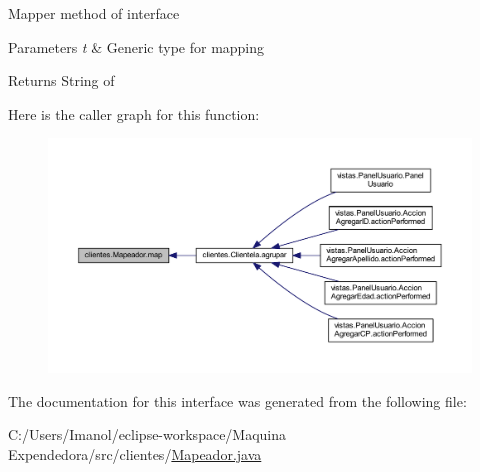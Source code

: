 Mapper method of interface 
\begin{DoxyParams}{Parameters}
{\em t} & Generic type for mapping \\
\hline
\end{DoxyParams}
\begin{DoxyReturn}{Returns}
String of 
\end{DoxyReturn}
Here is the caller graph for this function\+:\nopagebreak
\begin{figure}[H]
\begin{center}
\leavevmode
\includegraphics[width=350pt]{interfaceclientes_1_1_mapeador_a503d8f7a0b5debb1eab28d7ff4c717f5_icgraph}
\end{center}
\end{figure}


The documentation for this interface was generated from the following file\+:\begin{DoxyCompactItemize}
\item 
C\+:/\+Users/\+Imanol/eclipse-\/workspace/\+Maquina Expendedora/src/clientes/\mbox{\hyperlink{_mapeador_8java}{Mapeador.\+java}}\end{DoxyCompactItemize}
